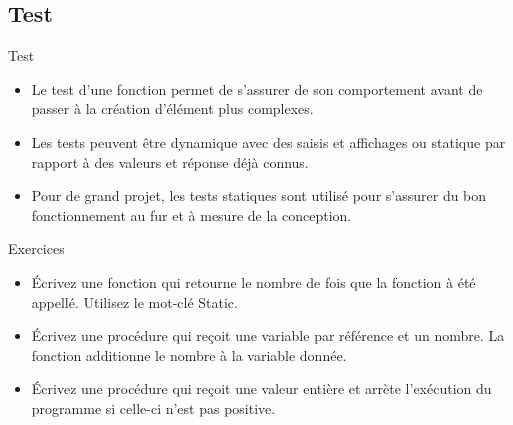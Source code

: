\documentclass[aspectratio=169,usenames,dvipsnames]{beamer}
\begin{document}
    \subsection{Test}
    \begin{frame}{Test}
        \begin{itemize}
            \item Le test d'une fonction permet de s'assurer de son comportement avant de passer à la création d'élément plus complexes.
            \item Les tests peuvent être dynamique avec des saisis et affichages ou statique par rapport à des valeurs et réponse déjà connus.
            \item Pour de grand projet, les tests statiques sont utilisé pour s'assurer du bon fonctionnement au fur et à mesure de la conception.
        \end{itemize}
    \end{frame}
    \begin{frame}{Exercices}
        \begin{itemize}
            \item Écrivez une fonction qui retourne le nombre de fois que la fonction à été appellé. Utilisez le mot-clé Static.
            \item Écrivez une procédure qui reçoit une variable par référence et un nombre. La fonction additionne le nombre à la variable donnée.
            \item Écrivez une procédure qui reçoit une valeur entière et arrète l'exécution du programme si celle-ci n'est pas positive.
        \end{itemize}
    \end{frame}
\end{document}
